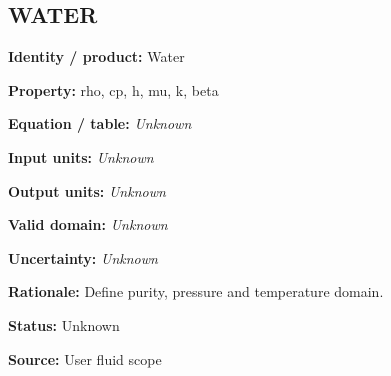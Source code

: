 \documentclass[11pt]{article}
\begin{document}
\par\noindent\begin{minipage}{\textwidth}\small\setlength{\parskip}{2pt}
\subsection*{WATER}
\textbf{Identity / product:} Water\par
\textbf{Property:} rho, cp, h, mu, k, beta\par
\textbf{Equation / table:} \textit{Unknown}\par
\textbf{Input units:} \textit{Unknown}\par
\textbf{Output units:} \textit{Unknown}\par
\textbf{Valid domain:} \textit{Unknown}\par
\textbf{Uncertainty:} \textit{Unknown}\par
\textbf{Rationale:} Define purity, pressure and temperature domain.\par
\textbf{Status:} Unknown\par
\textbf{Source:} User fluid scope\par
\end{minipage}\par\vspace{5pt}
\end{document}
